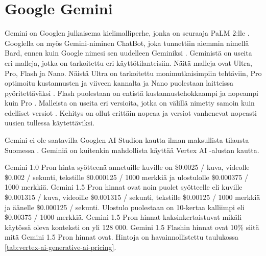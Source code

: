 \section{Google Gemini}

Gemini on Googlen julkaisema kielimalliperhe, jonka on seuraaja PaLM 2:lle
\parencite{googleKeynote2023}. Googlella on myös Gemini-niminen ChatBot, joka
tunnettiin aiemmin nimellä Bard, ennen kuin Google nimesi sen uudelleen
Geminiksi \parencite{geminiUpdates}. Geministä on useita eri malleja, jotka on
tarkoitettu eri käyttötilanteisiin. Näitä malleja ovat Ultra, Pro, Flash ja
Nano. \parencite{googleDeepmindGemini} Näistä Ultra on tarkoitettu
monimutkaisimpiin tehtäviin, Pro optimoitu kustannusten ja viiveen kannalta ja
Nano puolestaan laitteissa pyöritettäväksi
\parencite{googleDeepmindGeminiv1report}. Flash puolestaan on entistä
kustannustehokkaampi ja nopeampi kuin Pro \parencite{googleKeynote2024}.
Malleista on useita eri versioita, jotka on välillä nimetty samoin kuin
edelliset versiot \parencite{googleDeepmindGeminiv1_5report}. Kehitys on ollut
erittäin nopeaa ja versiot vanhenevat nopeasti uusien tullessa käytettäviksi.


Gemini ei ole saatavilla Googlen AI Studion kautta ilman maksullista tilausta
Suomessa \parencite{googleAiAvailableRegions}. Geminiä on kuitenkin mahdollista
käyttää Vertex AI -alustan kautta.

Gemini 1.0 Pron hinta syötteenä annetuille kuville on \$0.0025 / kuva, videolle
\$0.002 / sekunti, tekstille \$0.000125 / 1000 merkkiä ja ulostulolle
\$0.000375 / 1000 merkkiä. Gemini 1.5 Pron hinnat ovat noin puolet syötteelle
eli kuville \$0.001315 / kuva, videoille \$0.001315 / sekunti, tekstille
\$0.00125 / 1000 merkkiä ja äänelle \$0.000125 / sekunti. Ulostulo puolestaan
on 10-kertaa kalliimpi eli \$0.00375 / 1000 merkkiä. Gemini 1.5 Pron hinnat
kaksinkertaistuvat mikäli käytössä oleva konteksti on yli 128 000. Gemini
1.5 Flashin hinnat ovat 10\% siitä mitä Gemini 1.5 Pron hinnat ovat.
\parencite{vertexAiGenerativeAiPricing} Hintoja on havainnollistettu taulukossa
\ref{tab:vertex-ai-generative-ai-pricing}.

